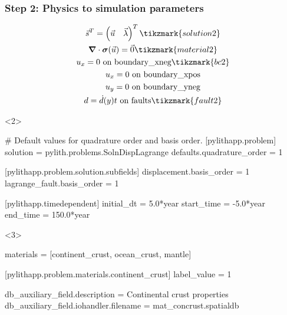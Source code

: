 \documentclass[aspectratio=169]{beamer}
\begin{document}
\begin{frame}[t,fragile]
  \frametitle{Step 2: Physics to simulation parameters}
  \summary{}

  \vspace*{-2\baselineskip}
  \begin{minipage}[t]{0.3\textwidth}
    {\scriptsize
    \begin{gather*}
    \vec{s}^T = \left( \vec{u} \quad \vec{\lambda} \right)^T \tikzmark{solution2}\\
    \tensor{\nabla} \cdot \tensor{\sigma}(\vec{u}) = \vec{0} \tikzmark{material2}\\
    u_x = 0 \text{ on boundary\_xneg} \tikzmark{bc2}\\
    u_x = 0 \text{ on boundary\_xpos} \\
    u_y = 0 \text{ on boundary\_yneg} \\
    d = \dot{d}(y) t \text{ on faults} \tikzmark{fault2}
    \end{gather*}}
  \end{minipage}
  \hfill
  \begin{minipage}[t]{0.67\textwidth}
    \begin{onlyenv}<2>
      \begin{cfgcode}
        # Default values for quadrature order and basis order.
        [pylithapp.problem]
        solution = pylith.problems.SolnDispLagrange
        defaults.quadrature_order = 1
        
        [pylithapp.problem.solution.subfields]
        displacement.basis_order = 1
        lagrange_fault.basis_order = 1

        [pylithapp.timedependent]
        initial_dt = 5.0*year
        start_time = -5.0*year
        end_time = 150.0*year
      \end{cfgcode}
    \end{onlyenv}
    \begin{onlyenv}<3>
      \begin{cfgcode}
        materials = [continent_crust, ocean_crust, mantle]

        [pylithapp.problem.materials.continent_crust]
        label_value = 1

        db_auxiliary_field.description = Continental crust properties
        db_auxiliary_field.iohandler.filename = mat_concrust.spatialdb


\end{cfgcode}
\end{onlyenv}
\end{minipage}
\end{frame}
\end{document}
